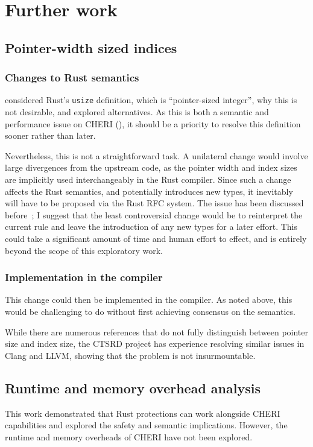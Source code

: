 \documentclass[dissertation.tex]{subfiles}
\begin{document}
\section{Further work}

\subsection{Pointer-width sized indices}
\label{sec:further-usize}

\subsubsection{Changes to Rust semantics}
 considered Rust's \texttt{usize} definition, which
is ``pointer-sized integer'', why this is not desirable, and explored
alternatives.
As this is both a semantic and performance issue on CHERI
(), it should be a priority to resolve this
definition sooner rather than later.

Nevertheless, this is not a straightforward task.
A unilateral change would involve large divergences from the upstream
code, as the pointer width and index sizes are implicitly used
interchangeably in the Rust compiler.
Since such a change affects the Rust semantics, and potentially
introduces new types, it inevitably will have to be proposed via the
Rust RFC system.
The issue has been discussed before~\cite{rust-rfc-isize,rust-int-uint};
I suggest that the least controversial change would be to reinterpret
the current rule and leave the introduction of any new types for a later
effort.
This could take a significant amount of time and human effort to effect,
and is entirely beyond the scope of this exploratory work.

\subsubsection{Implementation in the compiler}
This change could then be implemented in the compiler.
As noted above, this would be challenging to do without first achieving
consensus on the semantics.

While there are numerous references that do not fully distinguish
between pointer size and index size, the CTSRD project has experience
resolving similar issues in Clang and LLVM, showing that the problem is
not insurmountable.


\subsection{Runtime and memory overhead analysis}
This work demonstrated that Rust protections can work alongside CHERI
capabilities and explored the safety and semantic implications.
However, the runtime and memory overheads of CHERI have not been
explored.
\end{document}
